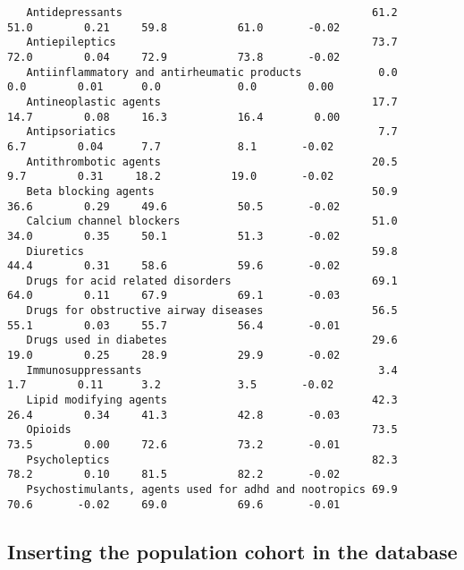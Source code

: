 \documentclass[]{article}
\begin{document}
\begin{verbatim}
   Antidepressants                                       61.2            51.0        0.21     59.8           61.0       -0.02    
   Antiepileptics                                        73.7            72.0        0.04     72.9           73.8       -0.02    
   Antiinflammatory and antirheumatic products            0.0             0.0        0.01      0.0            0.0        0.00    
   Antineoplastic agents                                 17.7            14.7        0.08     16.3           16.4        0.00    
   Antipsoriatics                                         7.7             6.7        0.04      7.7            8.1       -0.02    
   Antithrombotic agents                                 20.5             9.7        0.31     18.2           19.0       -0.02    
   Beta blocking agents                                  50.9            36.6        0.29     49.6           50.5       -0.02    
   Calcium channel blockers                              51.0            34.0        0.35     50.1           51.3       -0.02    
   Diuretics                                             59.8            44.4        0.31     58.6           59.6       -0.02    
   Drugs for acid related disorders                      69.1            64.0        0.11     67.9           69.1       -0.03    
   Drugs for obstructive airway diseases                 56.5            55.1        0.03     55.7           56.4       -0.01    
   Drugs used in diabetes                                29.6            19.0        0.25     28.9           29.9       -0.02    
   Immunosuppressants                                     3.4             1.7        0.11      3.2            3.5       -0.02    
   Lipid modifying agents                                42.3            26.4        0.34     41.3           42.8       -0.03    
   Opioids                                               73.5            73.5        0.00     72.6           73.2       -0.01    
   Psycholeptics                                         82.3            78.2        0.10     81.5           82.2       -0.02    
   Psychostimulants, agents used for adhd and nootropics 69.9            70.6       -0.02     69.0           69.6       -0.01    
\end{verbatim}

\fontsize{10}{12}
\selectfont

\hypertarget{inserting-the-population-cohort-in-the-database}{%
\subsection{Inserting the population cohort in the
database}\label{inserting-the-population-cohort-in-the-database}}
\end{document}
